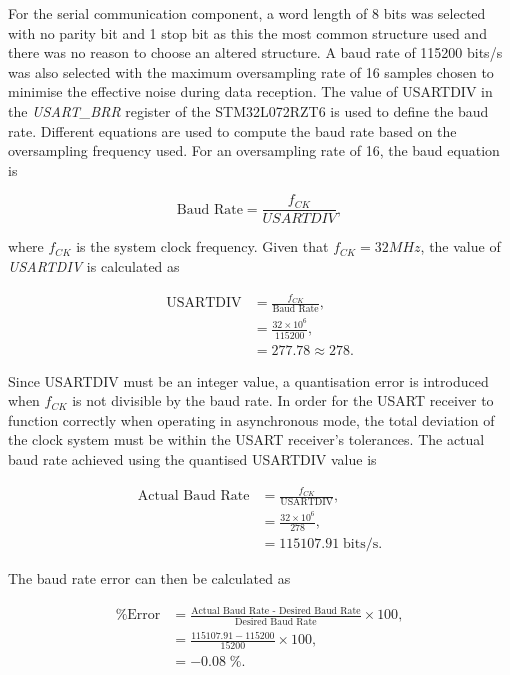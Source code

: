 For the serial communication component, a word length of 8 bits was selected with no parity bit and 1 stop bit as this the most common structure used and there was no reason to choose an altered structure. A baud rate of 115200 bits/s was also selected with the maximum oversampling rate of 16 samples chosen to minimise the effective noise during data reception. The value of USARTDIV in the \textit{USART\_BRR} register of the STM32L072RZT6 is used to define the baud rate. Different equations are used to compute the baud rate based on the oversampling frequency used. For an oversampling rate of 16, the baud equation is

\begin{equation}
	\text{Baud Rate}=\frac{f_{CK}}{\textit{USARTDIV}},
\end{equation}

where $f_{CK}$ is the system clock frequency. Given that $f_{CK}=32MHz$, the value of \textit{USARTDIV} is calculated as 

\begin{align}
	\text{USARTDIV}&=\frac{f_{CK}}{\text{Baud Rate}},\\
	&=\frac{32\times10^6}{115200},\\
	&=277.78\approx278.
\end{align} 

Since USARTDIV must be an integer value, a quantisation error is introduced when $f_{CK}$ is not divisible by
the baud rate. In order for the USART receiver to function correctly when operating in asynchronous mode, the total deviation of the clock system must be within the USART receiver's tolerances. The actual baud rate achieved using the quantised USARTDIV value is 

\begin{align}
	\text{Actual Baud Rate}&=\frac{f_{CK}}{\text{USARTDIV}},\\
	&=\frac{32\times10^6}{278},\\
	&=115107.91\;\text{bits/s}.
\end{align}

The baud rate error can then be calculated as

\begin{align}
	\text{\% Error}&=\frac{\text{Actual Baud Rate - Desired Baud Rate}}{\text{Desired Baud Rate}} \times 100,\\
	&=\frac{115107.91-115200}{15200} \times 100,\\
	&=-0.08\;\text{\%}.
\end{align}

